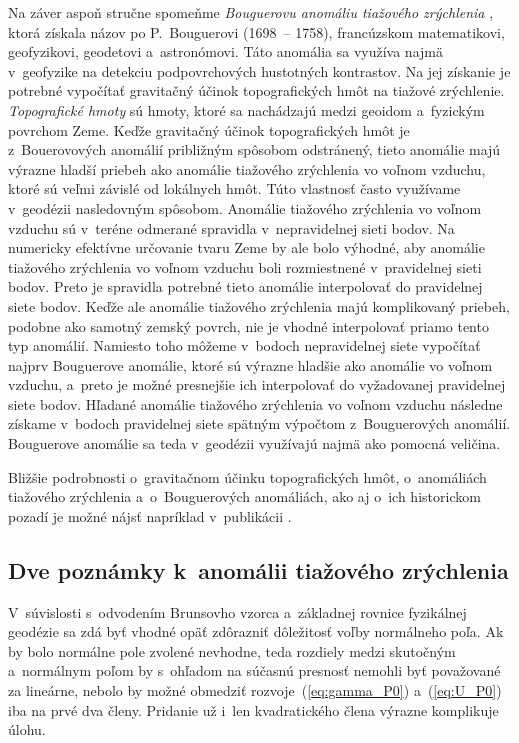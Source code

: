 \documentclass[a4paper, 12pt]{book}
\begin{document}
Na záver aspoň stručne spomeňme \emph{Bouguerovu anomáliu tiažového zrýchlenia} 
\parencite{MoritzPhysicalGeodesy}, ktorá získala názov po P.~Bouguerovi 
(1698~-- 1758), francúzskom matematikovi, geofyzikovi, geodetovi a~astronómovi.  
Táto anomália sa využíva najmä v~geofyzike na detekciu podpovrchových 
hustotných kontrastov.  Na jej získanie je potrebné vypočítať gravitačný účinok 
topografických hmôt na tiažové zrýchlenie.  \emph{Topografické hmoty} sú hmoty, 
ktoré sa nachádzajú medzi geoidom a~fyzickým povrchom Zeme.  Keďže gravitačný 
účinok topografických hmôt je z~Bouerovových anomálií približným spôsobom 
odstránený, tieto anomálie majú výrazne hladší priebeh ako anomálie tiažového 
zrýchlenia vo voľnom vzduchu, ktoré sú veľmi závislé od lokálnych hmôt.  Túto 
vlastnosť často využívame v~geodézii nasledovným spôsobom.  Anomálie tiažového 
zrýchlenia vo voľnom vzduchu sú v~teréne odmerané spravidla v~nepravidelnej 
sieti bodov.  Na numericky efektívne určovanie tvaru Zeme by ale bolo výhodné, 
aby anomálie tiažového zrýchlenia vo voľnom vzduchu boli rozmiestnené 
v~pravidelnej sieti bodov.  Preto je spravidla potrebné tieto anomálie 
interpolovať do pravidelnej siete bodov.  Keďže ale anomálie tiažového 
zrýchlenia majú komplikovaný priebeh, podobne ako samotný zemský povrch, nie je 
vhodné interpolovať priamo tento typ anomálií.  Namiesto toho môžeme v~bodoch 
nepravidelnej siete vypočítať najprv Bouguerove anomálie, ktoré sú výrazne 
hladšie ako anomálie vo voľnom vzduchu, a~preto je možné presnejšie ich 
interpolovať do vyžadovanej pravidelnej siete bodov.  Hľadané anomálie 
tiažového zrýchlenia vo voľnom vzduchu následne získame v~bodoch pravidelnej 
siete spätným výpočtom z~Bouguerových anomálií.  Bouguerove anomálie sa teda 
v~geodézii využívajú najmä ako pomocná veličina.

Bližšie podrobnosti o~gravitačnom účinku topografických hmôt, o~anomáliách 
tiažového zrýchlenia a~o~Bouguerových anomáliách, ako aj o~ich historickom 
pozadí je možné nájsť napríklad v~publikácii \textcite{Vajda2020}.



\subsection*{Dve poznámky k~anomálii tiažového zrýchlenia}

V~súvislosti s~odvodením Brunsovho vzorca a~základnej rovnice fyzikálnej 
geodézie sa zdá byť vhodné opäť zdôrazniť dôležitosť voľby normálneho poľa.  Ak 
by bolo normálne pole zvolené nevhodne, teda rozdiely medzi skutočným 
a~normálnym poľom by s~ohľadom na súčasnú presnosť nemohli byť považované za 
lineárne, nebolo by možné obmedziť rozvoje~(\ref{eq:gamma_P0}) 
a~(\ref{eq:U_P0}) iba na prvé dva členy.  Pridanie už i~len kvadratického člena 
výrazne komplikuje úlohu.
\end{document}
